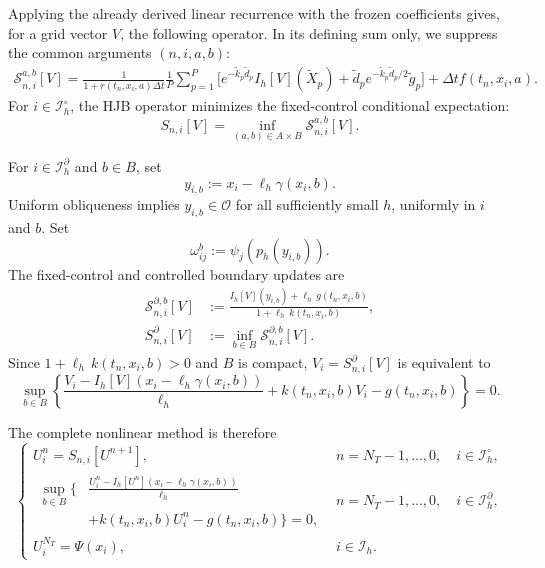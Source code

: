 \documentclass[11pt]{article}
\theoremstyle{definition}
\theoremstyle{remark}
\newcommand{\cO}{\mathcal{O}}
\newcommand{\cS}{\mathcal{S}}
\newcommand{\dt}{\Delta t}
\begin{document}
	Applying the already derived linear recurrence with the frozen coefficients gives, for a grid vector $V$, the following operator.  In its defining sum only, we suppress the common arguments $(n,i,a,b)$:
	\begin{equation}
		\begin{aligned}
			\cS_{n,i}^{a,b}[V]
			=\frac{1}{1+r(t_n,x_i,a)\dt}\frac1P\sum_{p=1}^P
			\Big[e^{-\widetilde k_p\widetilde d_p}I_h[V](\widetilde X_p)
			+\widetilde d_p e^{-\widetilde k_p\widetilde d_p/2}\widetilde g_p\Big]
			+\dt f(t_n,x_i,a).
		\end{aligned}
		\label{eq:fixed-operator}
	\end{equation}
	For $i\in\mathcal I_h^\circ$, the HJB operator minimizes the fixed-control conditional expectation:
	\begin{equation}
		S_{n,i}[V]=\inf_{(a,b)\in A\times B}\cS_{n,i}^{a,b}[V].
		\label{eq:HJB-operator}
	\end{equation}
	
	For $i\in\mathcal I_h^\partial$ and $b\in B$, set
	\[
	y_{i,b}:=x_i-\ell_h\gamma(x_i,b).
	\]
	Uniform obliqueness implies $y_{i,b}\in\cO$ for all sufficiently small $h$,
	uniformly in $i$ and $b$.  Set
	\[
	\omega_{ij}^b:=\psi_j(p_h(y_{i,b})).
	\]
	The fixed-control and controlled boundary updates are
	\begin{align}
		\cS_{n,i}^{\partial,b}[V]
		&:=\frac{I_h[V](y_{i,b})+\ell_h\,g(t_n,x_i,b)}
		{1+\ell_h\,k(t_n,x_i,b)},
		\label{eq:fixed-boundary-map}\\
		S_{n,i}^{\partial}[V]&:=\inf_{b\in B}\cS_{n,i}^{\partial,b}[V].
		\label{eq:controlled-boundary-map}
	\end{align}
	Since $1+\ell_h\,k(t_n,x_i,b)>0$ and $B$ is compact,
	$V_i=S_{n,i}^{\partial}[V]$ is equivalent to
	\begin{equation}
		\sup_{b\in B}
		\left\{
		\frac{V_i-I_h[V](x_i-\ell_h\gamma(x_i,b))}{\ell_h}
		+k(t_n,x_i,b)V_i-g(t_n,x_i,b)
		\right\}=0.
		\label{eq:discrete-boundary-residual}
	\end{equation}
	
	The complete nonlinear method is therefore
	\begin{equation}
		\begin{cases}
			U_i^n=S_{n,i}[U^{n+1}],
			&n=N_T-1,\ldots,0,\quad i\in\mathcal I_h^\circ,\\[7pt]
			\begin{aligned}
				\sup_{b\in B}\biggl\{&
				\frac{U_i^n-I_h[U^n](x_i-\ell_h\gamma(x_i,b))}{\ell_h}\\[-2pt]
				&+k(t_n,x_i,b)U_i^n-g(t_n,x_i,b)
				\biggr\}=0,
			\end{aligned}
			&n=N_T-1,\ldots,0,\quad i\in\mathcal I_h^\partial,\\[10pt]
			U_i^{N_T}=\Psi(x_i),&i\in\mathcal I_h .
		\end{cases}
		\label{eq:scheme}
	\end{equation}
	
\end{document}
